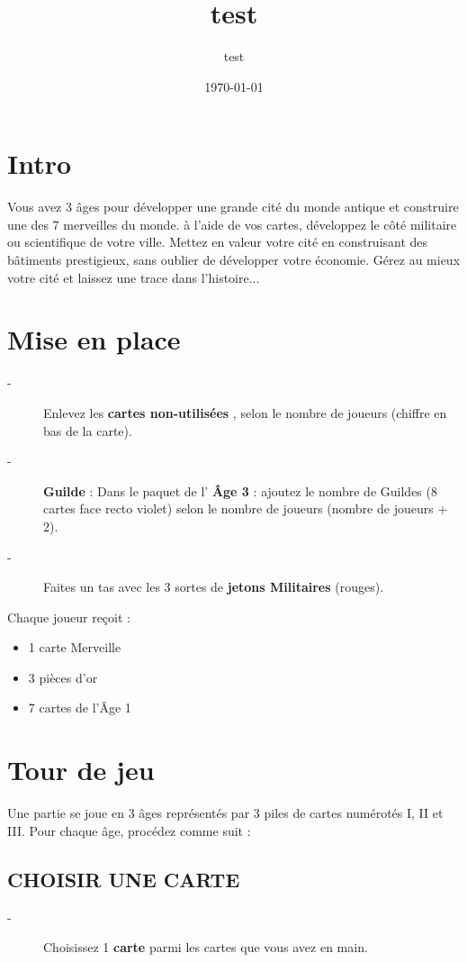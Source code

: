 \documentclass{article}%
\title{test}%
\author{test}%
\date{\today}%
\begin{document}
%
\pagestyle{empty}%
\normalsize%
\maketitle%
\pagestyle{header}%
\section{ Intro
}%
\label{sec:Intro}%
Vous avez 3 âges pour développer une grande cité du monde antique et construire une des 7 merveilles du
%
monde. à l’aide de vos cartes, développez le côté militaire ou scientifique de votre ville. Mettez en valeur
%
votre cité en construisant des bâtiments prestigieux, sans oublier de développer votre économie.
%
Gérez au mieux votre cité et laissez une trace dans l'histoire...


%
\section{ Mise en place
}%
\label{sec:Miseenplace}%
\begin{description}%
\item[{-} ]%
%
 Enlevez les %
\textbf{cartes non{-}utilisées}%
, selon le nombre de joueurs (chiffre en bas de la carte).
%
\item[{-} ]%
%
\textbf{Guilde}%
\textit{ }%
 : Dans le paquet de l'%
\textbf{Âge 3}%
\textit{ }%
 : ajoutez le nombre de Guildes (8 cartes face recto violet) selon le nombre de joueurs (nombre de joueurs + 2).
%
\item[{-} ]%
%
 Faites un tas avec les 3 sortes de %
\textbf{jetons Militaires}%
\textit{ }%
 (rouges).
%
\end{description}%
Chaque joueur reçoit :
%
\begin{itemize}%
\item%
%
 1 carte Merveille
%
\item%
%
 3 pièces d’or
%
\item%
%
 7 cartes de l'Âge 1
%
\end{itemize}

%
\section{ Tour de jeu
}%
\label{sec:Tourdejeu}%
Une partie se joue en 3 âges représentés par 3 piles de cartes numérotés I, II et III. Pour chaque âge, procédez comme suit :


%
\subsection{ CHOISIR UNE CARTE
}%
\label{subsec:CHOISIRUNECARTE}%
\begin{description}%
\item[{-} ]%
%
 Choisissez 1 %
\textbf{carte}%
\textit{ }%
 parmi les cartes que vous avez en main.
%
\end{description}
\end{document}
